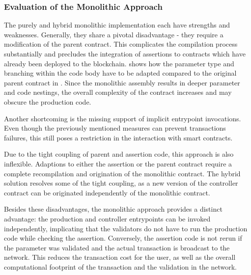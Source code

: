 \subsubsection{Evaluation of the Monolithic Approach}
The purely and hybrid monolithic implementation each have strengths and weaknesses. Generally, they share a pivotal disadvantage - they require a modification of the parent contract. This complicates the compilation process substantially and precludes the integration of assertions to contracts which have already been deployed to the blockchain.  shows how the parameter type and branching within the code body have to be adapted compared to the original parent contract in . Since the monolithic assembly results in deeper parameter and code nestings, the overall complexity of the contract increases and may obscure the production code.


Another shortcoming is the missing support of implicit entrypoint invocations. Even though the previously mentioned measures can prevent transactions failures, this still poses a restriction in the interaction with smart contracts. 

Due to the tight coupling of parent and assertion code, this approach is also inflexible. Adaptions to either the assertion or the parent contract require a complete recompilation and origination of the monolithic contract. The hybrid solution resolves some of the tight coupling, as a new version of the controller contract can be originated independently of the monolithic contract.

Besides these disadvantages, the monolithic approach provides a distinct advantage: the production and controller entrypoints can be invoked independently, implicating that the validators do not have to run the production code while checking the assertion. Conversely, the assertion code is not rerun if the parameter was validated and the actual transaction is broadcast to the network. This reduces the transaction cost for the user, as well as the overall computational footprint of the transaction and the validation in the network.

